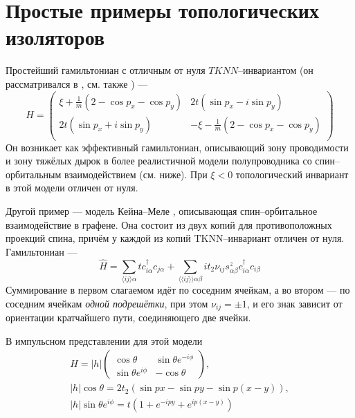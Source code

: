 \section{Простые примеры топологических изоляторов}
Простейший гамильтониан с отличным от нуля $TKNN$--инвариантом 
(он рассматривался в \cite{Qi2006}, см. также \cite{Bernevig2006}) ---
\begin{equation}
    \label{eff_so_ham}
    H = \left(\begin{matrix}
            \xi + \frac{1}{m}(2 - \cos{p_x} - \cos{p_y}) & 2t(\sin{p_x} - i\sin{p_y})   \\
            2t(\sin{p_x} + i\sin{p_y}) & - \xi - \frac{1}{m}(2 - \cos{p_x} - \cos{p_y}) \\
        \end{matrix}\right)
\end{equation}
Он возникает как эффективный гамильтониан, описывающий зону проводимости и зону
тяжёлых дырок в более реалистичной модели полупроводника со спин--орбитальным
взаимодействием (см. ниже). При $\xi < 0$ топологический инвариант в этой модели отличен
от нуля.

Другой пример --- модель Кейна--Меле \cite{Kane2005}, 
описывающая спин--орбитальное взаимодействие в 
графене. Она состоит из двух копий для противоположных проекций спина, причём у каждой
из копий $\mathrm{TKNN}$--инвариант отличен от нуля. Гамильтониан --- 
\begin{equation}
		\hat{H} = 
			\sum_{\langle ij \rangle \alpha} t c^\dagger_{i\alpha} c_{j\alpha} + 
				\sum_{\langle\langle ij \rangle\rangle \alpha\beta} 
					it_2 \nu_{ij} s^z_{\alpha \beta} c^\dagger_{i\alpha} c_{i\beta}
\end{equation}
Суммирование в первом слагаемом идёт по соседним ячейкам, а во втором --- по соседним
ячейкам \emph{одной подрешётки}, при этом $\nu_{ij} = \pm 1$, и его знак зависит
от ориентации кратчайшего пути, соединяющего две ячейки.

В импульсном представлении для этой модели
\begin{equation}
    \begin{gathered}
    	H = |h|\left(
            \begin{matrix}
                \cos{\theta} & \sin{\theta}e^{-i\phi} \\
                \sin{\theta}e^{i\phi} & -\cos{\theta}
            \end{matrix}
    	\right),\\
    	|h|\cos{\theta} = 2t_2 (\sin{px} - \sin{py} - \sin{p(x-y)}), \\
    	|h|\sin{\theta}e^{i\phi} = t(1 + e^{-ipy} + e^{ip(x-y)}) 
    \end{gathered}
\end{equation}
